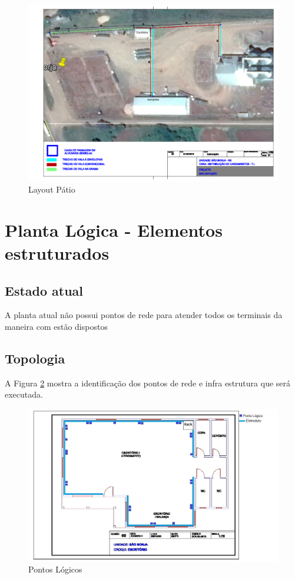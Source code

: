 \documentclass[	DIV=calc,%
							paper=a4,%
							fontsize=12pt,%
							onecolumn]{scrartcl}	 					%
\begin{document}
\begin{figure}[H]
	\centering
	\includegraphics[width=\textwidth]{fig2}
	\caption{Layout Pátio}
	\label{fig2}
\end{figure}

\section{Planta Lógica - Elementos estruturados}

\subsection{Estado atual}
A planta atual não possui pontos de rede para atender todos os terminais da maneira com estão dispostos

\subsection{Topologia}

A Figura \ref{fig3} mostra a identificação dos pontos de rede e infra estrutura que será executada.

\begin{figure}[H]
	\centering
	\includegraphics[width=\textwidth]{fig3}
	\caption{Pontos Lógicos}
	\label{fig3}
\end{figure}
\end{document}
